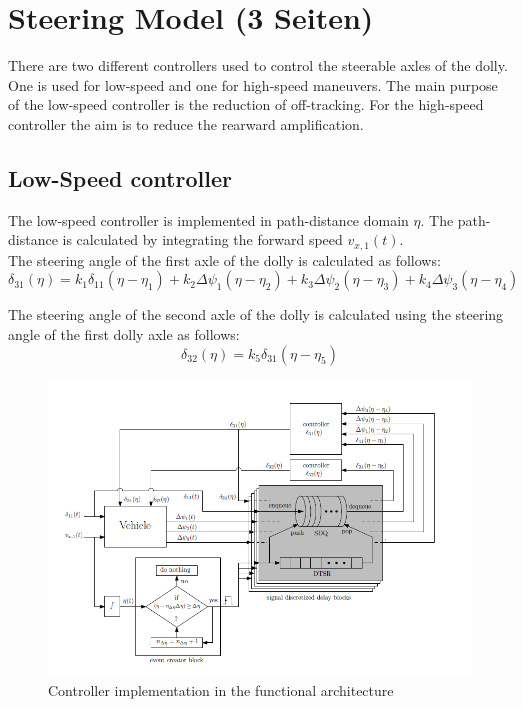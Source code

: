 \documentclass[ExampleMasters.tex]{subfiles}
\begin{document}
\clearpage
\chapter{Steering Model (3 Seiten)}
\label{chap:steering_model}
There are two different controllers used to control the steerable axles of the dolly. One is used for low-speed and one for high-speed maneuvers. The main purpose of the low-speed controller is the reduction of off-tracking.
For the high-speed controller the aim is to reduce the rearward amplification.
\section{Low-Speed controller}
\label{sec:low-speed_controller}
The low-speed controller is implemented in path-distance domain $\eta$. The path-distance is calculated by integrating the forward speed $v_{x,1}(t)$. \\
The steering angle of the first axle of the dolly is calculated as follows: 
\begin{equation}
\delta_{31}(\eta)=k_1\delta_{11}(\eta-\eta_1)+k_2\Delta\psi_1(\eta-\eta_2)+k_3\Delta\psi_2(\eta-\eta_3)+k_4\Delta\psi_3(\eta-\eta_4)
\end{equation}

\label{eq:delta31_lowspeed}

The steering angle of the second axle of the dolly is calculated using the steering angle of the first dolly axle as follows:
\begin{equation}
\delta_{32}(\eta)=k_5\delta_{31}(\eta-\eta_5)
\end{equation}
\label{eq:delta32_lowspeed}

\begin{figure}[h]
	\centering
	\includegraphics[width=1.0\linewidth]{figures/Low_speed_diagram}
	\caption[]{Controller implementation in the functional architecture \cite{Low-speed_paper}}
	
	\label{fig:low_speed_diagram}
\end{figure}
\end{document}
